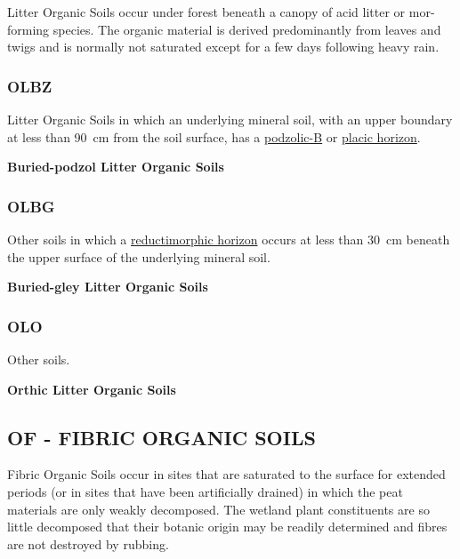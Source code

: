 \documentclass[
  letterpaper,
  DIV=11,
  numbers=noendperiod]{scrreprt}
\begin{document}
Litter Organic Soils occur under forest beneath a canopy of acid litter
or mor-forming species. The organic material is derived predominantly
from leaves and twigs and is normally not saturated except for a few
days following heavy rain.

\hypertarget{sec-key-OLBZ}{%
\subsubsection{\texorpdfstring{\textbf{OLBZ}}{OLBZ}}\label{sec-key-OLBZ}}

Litter Organic Soils in which an underlying mineral soil, with an upper
boundary at less than 90~cm from the soil surface, has a
\protect\hyperlink{sec-diag-podzb}{podzolic-B} or
\protect\hyperlink{sec-diag-plac}{placic horizon}.

\textbf{Buried-podzol Litter Organic Soils}

\hypertarget{sec-key-OLBG}{%
\subsubsection{\texorpdfstring{\textbf{OLBG}}{OLBG}}\label{sec-key-OLBG}}

Other soils in which a \protect\hyperlink{sec-diag-redmh}{reductimorphic
horizon} occurs at less than 30~cm beneath the upper surface of the
underlying mineral soil.

\textbf{Buried-gley Litter Organic Soils}

\hypertarget{sec-key-OLO}{%
\subsubsection{\texorpdfstring{\textbf{OLO}}{OLO}}\label{sec-key-OLO}}

Other soils.

\textbf{Orthic Litter Organic Soils}

\hypertarget{sec-OF}{%
\subsection{\texorpdfstring{\textbf{OF} - FIBRIC ORGANIC
SOILS}{OF - FIBRIC ORGANIC SOILS}}\label{sec-OF}}

Fibric Organic Soils occur in sites that are saturated to the surface
for extended periods (or in sites that have been artificially drained)
in which the peat materials are only weakly decomposed. The wetland
plant constituents are so little decomposed that their botanic origin
may be readily determined and fibres are not destroyed by rubbing.
\end{document}
